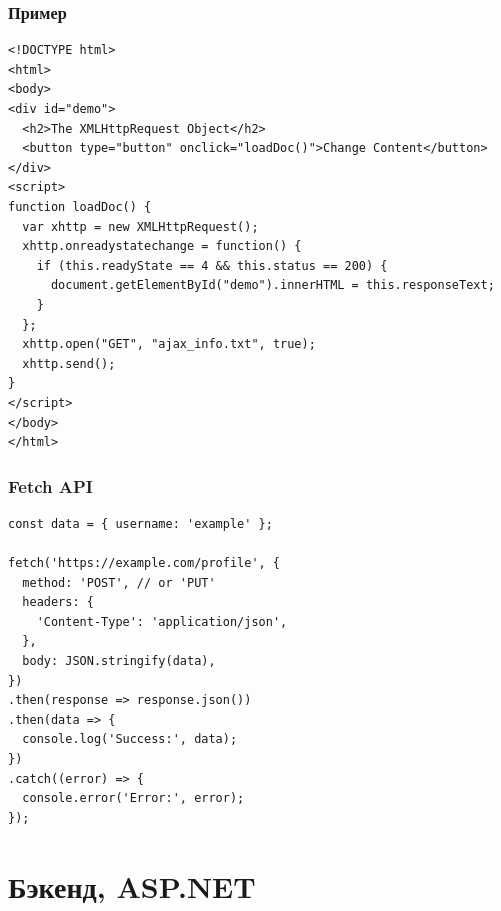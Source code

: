\documentclass{../../slides-style}
\begin{document}
    \begin{frame}[fragile]
        \frametitle{Пример}
        \begin{scriptsize}
            \begin{verbatim}
<!DOCTYPE html>
<html>
<body>
<div id="demo">
  <h2>The XMLHttpRequest Object</h2>
  <button type="button" onclick="loadDoc()">Change Content</button>
</div>
<script>
function loadDoc() {
  var xhttp = new XMLHttpRequest();
  xhttp.onreadystatechange = function() {
    if (this.readyState == 4 && this.status == 200) {
      document.getElementById("demo").innerHTML = this.responseText;
    }
  };
  xhttp.open("GET", "ajax_info.txt", true);
  xhttp.send();
}
</script>
</body>
</html>
            \end{verbatim}
        \end{scriptsize}
        \vspace{-3mm}
    \end{frame}

    \begin{frame}[fragile]
        \frametitle{Fetch API}
        \begin{scriptsize}
            \begin{verbatim}
const data = { username: 'example' };

fetch('https://example.com/profile', {
  method: 'POST', // or 'PUT'
  headers: {
    'Content-Type': 'application/json',
  },
  body: JSON.stringify(data),
})
.then(response => response.json())
.then(data => {
  console.log('Success:', data);
})
.catch((error) => {
  console.error('Error:', error);
});
            \end{verbatim}
        \end{scriptsize}
        \vspace{-3mm}
    \end{frame}

    \section{Бэкенд, ASP.NET}
\end{document}

